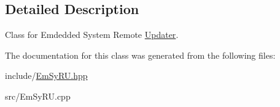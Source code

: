 \subsection{Detailed Description}
Class for Emdedded System Remote \hyperlink{classUpdater}{Updater}. 

The documentation for this class was generated from the following files\-:\begin{DoxyCompactItemize}
\item 
include/\hyperlink{EmSyRU_8hpp}{Em\-Sy\-R\-U.\-hpp}\item 
src/Em\-Sy\-R\-U.\-cpp\end{DoxyCompactItemize}
